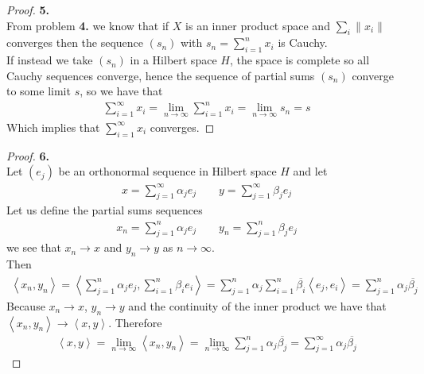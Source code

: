 \documentclass[11pt]{article}
\newcommand{\inprd}[1]{\left\langle{#1}\right\rangle}
\theoremstyle{definition}
\begin{document}
\cleardoublepage
\begin{proof}{\textbf{5.}}\\
From problem \textbf{4.} we know that if $X$ is an inner product space and
$\sum_{i} \|x_i\|$ converges then the sequence $(s_n)$ with
$s_n = \sum_{i=1}^n x_i$ is Cauchy.
\\
If instead we take $(s_n)$ in a Hilbert space $H$, the space is complete so
all Cauchy sequences converge, hence the sequence of partial sums $(s_n)$
converge to some limit $s$, so we have that
\begin{align*}
    \sum_{i=1}^\infty x_i = \lim_{n\to \infty}\sum_{i=1}^n x_i
    = \lim_{n\to \infty} s_n = s
\end{align*}
Which implies that $\sum_{i=1}^\infty x_i$ converges.
\end{proof}

\cleardoublepage
\begin{proof}{\textbf{6.}}\\
Let $(e_j)$ be an orthonormal sequence in Hilbert space $H$ and let 
\begin{align*}
    x = \sum_{j=1}^\infty \alpha_j e_j
    \qquad
    y = \sum_{j=1}^\infty \beta_j e_j
\end{align*}
Let us define the partial sums sequences
\begin{align*}
    x_n = \sum_{j=1}^n \alpha_j e_j
    \qquad
    y_n = \sum_{j=1}^n \beta_j e_j
\end{align*}
we see that $x_n \to x$ and $y_n \to y$ as $n \to \infty$.
\\
Then
\begin{align*}
    \inprd{x_n, y_n} 
    = \inprd{\sum_{j=1}^n \alpha_j e_j, \sum_{i=1}^n \beta_i e_i}
    = \sum_{j=1}^n \alpha_j\sum_{i=1}^n\overline{\beta_i}\inprd{e_j, e_i}
    = \sum_{j=1}^n \alpha_j\overline{\beta_j}
\end{align*}
Because $x_n \to x$, $y_n \to y$ and the continuity of the inner product we
have that $\inprd{x_n, y_n} \to \inprd{x, y}$. Therefore
\begin{align*}
    \inprd{x, y} = \lim_{n\to\infty}\inprd{x_n, y_n}
    = \lim_{n\to\infty} \sum_{j=1}^n \alpha_j\overline{\beta_j}
    = \sum_{j=1}^\infty \alpha_j\overline{\beta_j}
\end{align*}
\end{proof}
\end{document}
